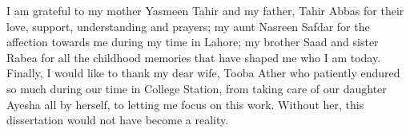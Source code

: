 I am grateful to my mother Yasmeen Tahir and my father, Tahir Abbas for their love, support, understanding and prayers; my aunt Nasreen Safdar for the  affection towards me during my time in Lahore; my brother Saad and sister Rabea for all the childhood memories that have shaped me who I am today. Finally, I would like to thank my dear wife, Tooba Ather who patiently endured so much during our time in College Station, from taking care of our daughter Ayesha all by herself, to letting me focus on this work. Without her, this dissertation would not have become a reality.

\pagebreak{}
